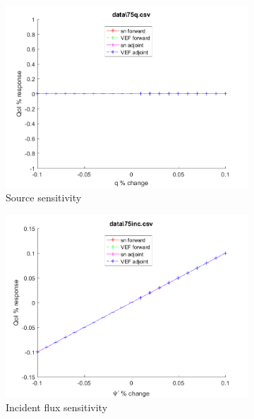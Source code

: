 \documentclass{article}
\begin{document}
\begin{figure}[H]
\label{Case75Sens}
\centering
\begin{subfigure}{.5\textwidth}
  \centering
  \includegraphics[width=.98\linewidth]{IanProposal/figures2/75qSens.png}
  \caption{Source sensitivity}
  \label{fig:sfig1}
\end{subfigure}%
\begin{subfigure}{.5\textwidth}
  \centering
  \includegraphics[width=.98\linewidth]{IanProposal/figures2/75incSens.png}
  \caption{Incident flux sensitivity}
  \label{fig:sfig4}
\end{subfigure}%
\\
\begin{subfigure}{.5\textwidth}
  \centering

\end{subfigure}
\end{figure}
\end{document}
